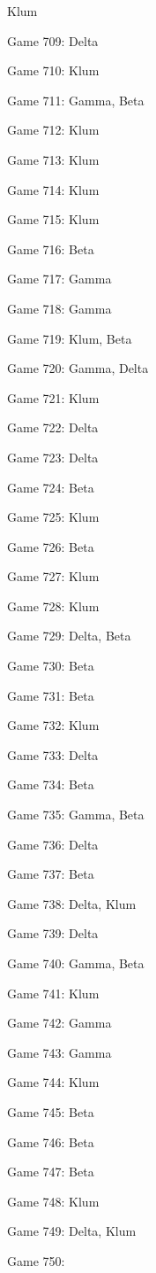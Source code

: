 \documentclass{article}
\begin{document}
\begin{multicols}{3}
\begin{compactitem}
Klum
\item Game 709:
Delta
\item Game 710:
Klum
\item Game 711:
Gamma, Beta
\item Game 712:
Klum
\item Game 713:
Klum
\item Game 714:
Klum
\item Game 715:
Klum
\item Game 716:
Beta
\item Game 717:
Gamma
\item Game 718:
Gamma
\item Game 719:
Klum, Beta
\item Game 720:
Gamma, Delta
\item Game 721:
Klum
\item Game 722:
Delta
\item Game 723:
Delta
\item Game 724:
Beta
\item Game 725:
Klum
\item Game 726:
Beta
\item Game 727:
Klum
\item Game 728:
Klum
\item Game 729:
Delta, Beta
\item Game 730:
Beta
\item Game 731:
Beta
\item Game 732:
Klum
\item Game 733:
Delta
\item Game 734:
Beta
\item Game 735:
Gamma, Beta
\item Game 736:
Delta
\item Game 737:
Beta
\item Game 738:
Delta, Klum
\item Game 739:
Delta
\item Game 740:
Gamma, Beta
\item Game 741:
Klum
\item Game 742:
Gamma
\item Game 743:
Gamma
\item Game 744:
Klum
\item Game 745:
Beta
\item Game 746:
Beta
\item Game 747:
Beta
\item Game 748:
Klum
\item Game 749:
Delta, Klum
\item Game 750:

\end{compactitem}
\end{multicols}
\end{document}
